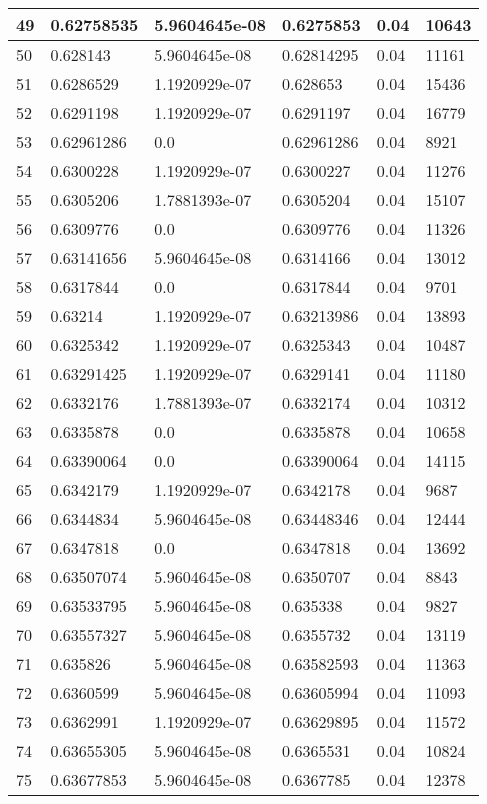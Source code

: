 \begin{longtable}{|l|l|l|l|l|l|}
49 & 0.62758535 & 5.9604645e-08 & 0.6275853 & 0.04 & 10643 \\ \hline 
50 & 0.628143 & 5.9604645e-08 & 0.62814295 & 0.04 & 11161 \\ \hline 
51 & 0.6286529 & 1.1920929e-07 & 0.628653 & 0.04 & 15436 \\ \hline 
52 & 0.6291198 & 1.1920929e-07 & 0.6291197 & 0.04 & 16779 \\ \hline 
53 & 0.62961286 & 0.0 & 0.62961286 & 0.04 & 8921 \\ \hline 
54 & 0.6300228 & 1.1920929e-07 & 0.6300227 & 0.04 & 11276 \\ \hline 
55 & 0.6305206 & 1.7881393e-07 & 0.6305204 & 0.04 & 15107 \\ \hline 
56 & 0.6309776 & 0.0 & 0.6309776 & 0.04 & 11326 \\ \hline 
57 & 0.63141656 & 5.9604645e-08 & 0.6314166 & 0.04 & 13012 \\ \hline 
58 & 0.6317844 & 0.0 & 0.6317844 & 0.04 & 9701 \\ \hline 
59 & 0.63214 & 1.1920929e-07 & 0.63213986 & 0.04 & 13893 \\ \hline 
60 & 0.6325342 & 1.1920929e-07 & 0.6325343 & 0.04 & 10487 \\ \hline 
61 & 0.63291425 & 1.1920929e-07 & 0.6329141 & 0.04 & 11180 \\ \hline 
62 & 0.6332176 & 1.7881393e-07 & 0.6332174 & 0.04 & 10312 \\ \hline 
63 & 0.6335878 & 0.0 & 0.6335878 & 0.04 & 10658 \\ \hline 
64 & 0.63390064 & 0.0 & 0.63390064 & 0.04 & 14115 \\ \hline 
65 & 0.6342179 & 1.1920929e-07 & 0.6342178 & 0.04 & 9687 \\ \hline 
66 & 0.6344834 & 5.9604645e-08 & 0.63448346 & 0.04 & 12444 \\ \hline 
67 & 0.6347818 & 0.0 & 0.6347818 & 0.04 & 13692 \\ \hline 
68 & 0.63507074 & 5.9604645e-08 & 0.6350707 & 0.04 & 8843 \\ \hline 
69 & 0.63533795 & 5.9604645e-08 & 0.635338 & 0.04 & 9827 \\ \hline 
70 & 0.63557327 & 5.9604645e-08 & 0.6355732 & 0.04 & 13119 \\ \hline 
71 & 0.635826 & 5.9604645e-08 & 0.63582593 & 0.04 & 11363 \\ \hline 
72 & 0.6360599 & 5.9604645e-08 & 0.63605994 & 0.04 & 11093 \\ \hline 
73 & 0.6362991 & 1.1920929e-07 & 0.63629895 & 0.04 & 11572 \\ \hline 
74 & 0.63655305 & 5.9604645e-08 & 0.6365531 & 0.04 & 10824 \\ \hline 
75 & 0.63677853 & 5.9604645e-08 & 0.6367785 & 0.04 & 12378 \\ \hline 
\end{longtable}